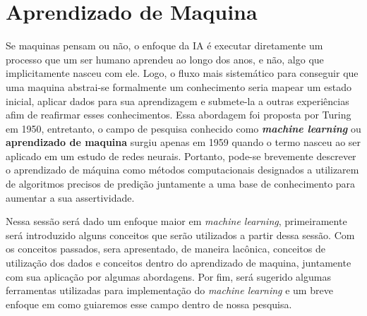 \section{Aprendizado de Maquina}
Se maquinas pensam ou não, o enfoque da IA é executar diretamente um processo que um ser humano aprendeu ao longo dos anos, e não, algo que implicitamente nasceu com ele. Logo, o fluxo mais sistemático para conseguir que uma maquina abstrai-se formalmente um conhecimento seria mapear um estado inicial, aplicar dados para sua aprendizagem e submete-la a outras experiências afim de reafirmar esses conhecimentos. Essa abordagem foi proposta por Turing em 1950, entretanto, o campo de pesquisa conhecido como \textit{\textbf{machine learning}} ou \textbf{aprendizado de maquina} surgiu apenas em 1959 quando o termo nasceu ao ser aplicado em um estudo de redes neurais. Portanto, pode-se brevemente descrever o aprendizado de máquina como métodos computacionais designados a utilizarem de algoritmos precisos de predição juntamente a uma base de conhecimento para aumentar a sua assertividade\cite[1]{turing1950, samuel1959some, mohri2012foundations}.

Nessa sessão será dado um enfoque maior em \textit{machine learning}, primeiramente será introduzido alguns conceitos que serão utilizados a partir dessa sessão. Com os conceitos passados, sera apresentado, de maneira lacônica, conceitos de utilização dos dados e conceitos dentro do aprendizado de maquina, juntamente com sua aplicação por algumas abordagens. Por fim, será sugerido algumas ferramentas utilizadas para implementação do \textit{machine learning} e um breve enfoque em como guiaremos esse campo dentro de nossa pesquisa.

